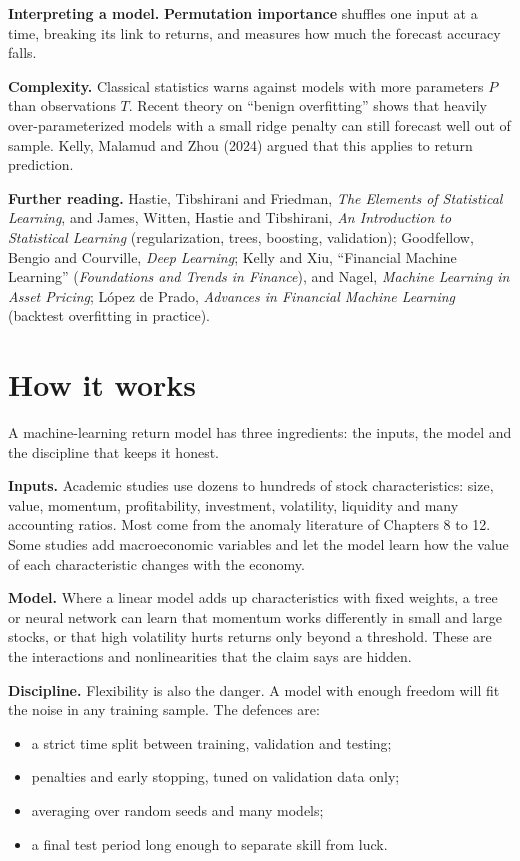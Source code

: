 \textbf{Interpreting a model.} \textbf{Permutation importance} shuffles one input at a time, breaking its link to returns, and measures how much the forecast accuracy falls.

\textbf{Complexity.} Classical statistics warns against models with more parameters $P$ than observations $T$. Recent theory on ``benign overfitting'' shows that heavily over-parameterized models with a small ridge penalty can still forecast well out of sample. Kelly, Malamud and Zhou (2024) argued that this applies to return prediction.

\textbf{Further reading.} Hastie, Tibshirani and Friedman, \emph{The Elements of Statistical Learning}, and James, Witten, Hastie and Tibshirani, \emph{An Introduction to Statistical Learning} (regularization, trees, boosting, validation); Goodfellow, Bengio and Courville, \emph{Deep Learning}; Kelly and Xiu, ``Financial Machine Learning'' (\emph{Foundations and Trends in Finance}), and Nagel, \emph{Machine Learning in Asset Pricing}; L\'opez de Prado, \emph{Advances in Financial Machine Learning} (backtest overfitting in practice).

\section{How it works}
\label{sec:21-how}

A machine-learning return model has three ingredients: the inputs, the model and the discipline that keeps it honest.

\textbf{Inputs.} Academic studies use dozens to hundreds of stock characteristics: size, value, momentum, profitability, investment, volatility, liquidity and many accounting ratios. Most come from the anomaly literature of Chapters 8 to 12. Some studies add macroeconomic variables and let the model learn how the value of each characteristic changes with the economy.

\textbf{Model.} Where a linear model adds up characteristics with fixed weights, a tree or neural network can learn that momentum works differently in small and large stocks, or that high volatility hurts returns only beyond a threshold. These are the interactions and nonlinearities that the claim says are hidden.

\textbf{Discipline.} Flexibility is also the danger. A model with enough freedom will fit the noise in any training sample. The defences are:

\begin{itemize}
  \item a strict time split between training, validation and testing;
  \item penalties and early stopping, tuned on validation data only;
  \item averaging over random seeds and many models;
  \item a final test period long enough to separate skill from luck.
\end{itemize}

